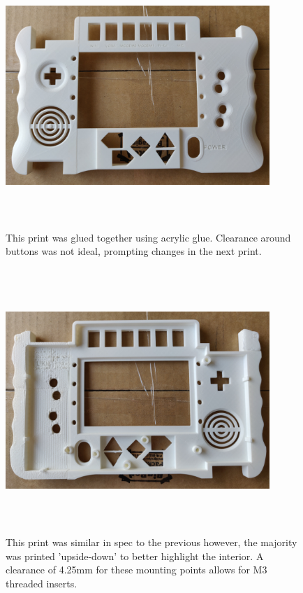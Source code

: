 \begin{figure} [h]
    \centering
    \includegraphics[width=10cm,height=10cm,keepaspectratio]{Figures/secondprint.png}
    \caption{This print was glued together using acrylic glue. Clearance around buttons was not ideal, prompting changes in the next print.}
    \label{fig:Second}
\end{figure}

\begin{figure} [h]
    \centering
    \includegraphics[width=10cm,height=10cm,keepaspectratio]{Figures/secondtothirdprint.png}
    \caption{This print was similar in spec to the previous however, the majority was printed 'upside-down' to better highlight the interior. A clearance of 4.25mm for these mounting points allows for M3 threaded inserts.}
    \label{fig:Secondtothird}
\end{figure}

